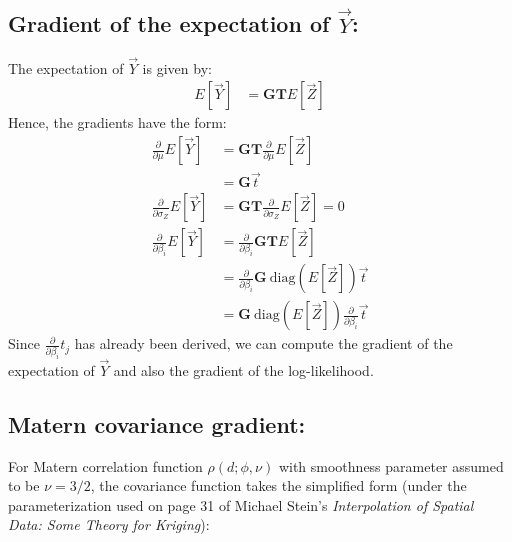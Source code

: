 {\subsection*{Gradient of the expectation of $\vec{Y}$:}
The expectation of $\vec{Y}$ is given by:
\begin{align*}
E[\vec{Y}] &= \mathbf{G T} E[\vec{Z}] 
\end{align*}
Hence, the gradients have the form:
\begin{align*}
\frac{\partial}{\partial \mu} E[\vec{Y}] &= \mathbf{GT} \frac{\partial}{\partial \mu} E[\vec{Z}] \\
&= \mathbf{G} \vec{t} \\
\frac{\partial}{\partial \sigma_{Z}} E[\vec{Y}] &= \mathbf{GT} \frac{\partial}{\partial \sigma_{Z}} E[\vec{Z}] = 0 \\
\frac{\partial}{\partial \beta_i} E[\vec{Y}] &= \frac{\partial}{\partial \beta_i} \mathbf{G T} E[\vec{Z}] \\
&= \frac{\partial}{\partial \beta_i} \mathbf{G} \ \text{diag}(E[\vec{Z}]) \vec{t} \\
&= \mathbf{G} \ \text{diag}(E[\vec{Z}]) \frac{\partial}{\partial \beta_i} \vec{t}
\end{align*}
Since $\frac{\partial}{\partial \beta_i} t_j$ has already been derived, we can compute the gradient of the expectation of $\vec{Y}$ and also the gradient of the log-likelihood.

\subsection*{Matern covariance gradient:}

For Matern correlation function $\rho(d; \phi, \nu)$ with smoothness parameter assumed to be $\nu = 3/2$, the covariance function takes the simplified form (under the parameterization used on page 31 of Michael Stein's \textit{Interpolation of Spatial Data: Some Theory for Kriging}):

}

